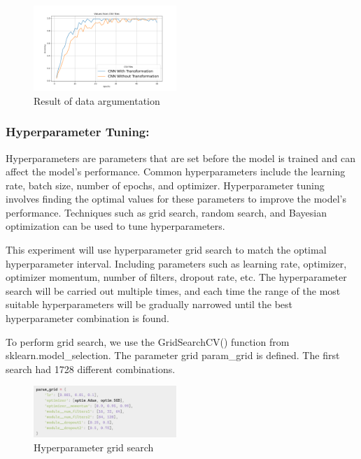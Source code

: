 \documentclass[twocolumn]{article}
\begin{document}
    \begin{figure}[ht]
        \centering
        \includegraphics[width=0.48\textwidth]{data_argumentation.png}
        \caption{Result of data argumentation}
        \label{fig:data_argumentation}
    \end{figure}

    \subsubsection{Hyperparameter Tuning:} Hyperparameters are parameters that are set before the model is trained and can affect the model's performance. Common hyperparameters include the learning rate, batch size, number of epochs, and optimizer. Hyperparameter tuning involves finding the optimal values for these parameters to improve the model's performance. Techniques such as grid search, random search, and Bayesian optimization can be used to tune hyperparameters.

    This experiment will use hyperparameter grid search to match the optimal hyperparameter interval. Including parameters such as learning rate, optimizer, optimizer momentum, number of filters, dropout rate, etc. The hyperparameter search will be carried out multiple times, and each time the range of the most suitable hyperparameters will be gradually narrowed until the best hyperparameter combination is found. 
    
    To perform grid search, we use the GridSearchCV() function from sklearn.model\_selection. The parameter grid param\_grid is defined. The first search had 1728 different combinations.

    \begin{figure}[ht]
        \centering
        \includegraphics[width=0.48\textwidth]{grid_search.png}
        \caption{Hyperparameter grid search}
        \label{fig:grid_search}
    \end{figure}
\end{document}
